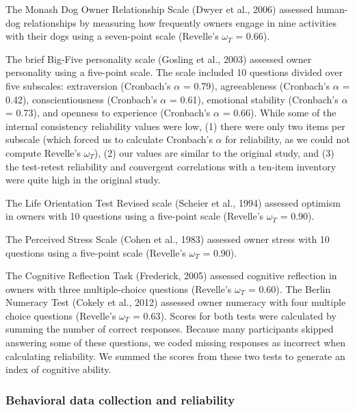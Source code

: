 \documentclass[
  english,
  ,pub,floatsintext]{apa6}
\begin{document}
The Monash Dog Owner Relationship Scale (Dwyer et al., 2006) assessed human-dog relationships by measuring how frequently owners engage in nine activities with their dogs using a seven-point scale (Revelle's \(\omega_{T}\) = 0.66).

The brief Big-Five personality scale (Gosling et al., 2003) assessed owner personality using a five-point scale. The scale included 10 questions divided over five subscales: extraversion (Cronbach's \(\alpha\) = 0.79), agreeableness (Cronbach's \(\alpha\) = 0.42), conscientiousness (Cronbach's \(\alpha\) = 0.61), emotional stability (Cronbach's \(\alpha\) = 0.73), and openness to experience (Cronbach's \(\alpha\) = 0.66). While some of the internal consistency reliability values were low, (1) there were only two items per subscale (which forced us to calculate Cronbach's \(\alpha\) for reliability, as we could not compute Revelle's \(\omega_{T}\)), (2) our values are similar to the original study, and (3) the test-retest reliability and convergent correlations with a ten-item inventory were quite high in the original study.

The Life Orientation Test Revised scale (Scheier et al., 1994) assessed optimism in owners with 10 questions using a five-point scale (Revelle's \(\omega_{T}\) = 0.90).

The Perceived Stress Scale (Cohen et al., 1983) assessed owner stress with 10 questions using a five-point scale (Revelle's \(\omega_{T}\) = 0.90).

The Cognitive Reflection Task (Frederick, 2005) assessed cognitive reflection in owners with three multiple-choice questions (Revelle's \(\omega_{T}\) = 0.60). The Berlin Numeracy Test (Cokely et al., 2012) assessed owner numeracy with four multiple choice questions (Revelle's \(\omega_{T}\) = 0.63). Scores for both tests were calculated by summing the number of correct responses. Because many participants skipped answering some of these questions, we coded missing responses as incorrect when calculating reliability. We summed the scores from these two tests to generate an index of cognitive ability.

\hypertarget{behavioral-data-collection-and-reliability}{%
\subsubsection{Behavioral data collection and reliability}\label{behavioral-data-collection-and-reliability}}
\end{document}
